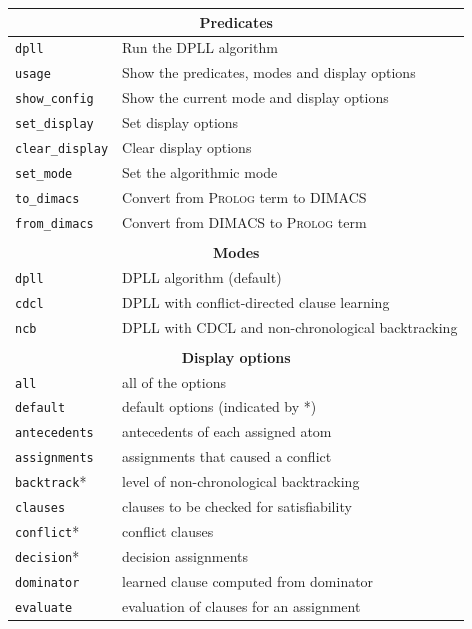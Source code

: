 \documentclass[11pt]{article}
\newcommand*{\p}[1]{\textup{\texttt{#1}}}
\newcommand*{\pl}{\textsc{Prolog}}
\begin{document}
\bigskip\bigskip

\begin{center}
\begin{tabular}{|l|l|}
\hline
\multicolumn{2}{|c|}{\textbf{\large Predicates}}\\
\hline
\p{dpll}&Run the DPLL algorithm\\
\p{usage}&Show the predicates, modes and display options \\
\p{show\_config}&Show the current mode and display options\\
\p{set\_display}&Set display options\\
\p{clear\_display}&Clear display options\\
\p{set\_mode}&Set the algorithmic mode\\
\p{to\_dimacs}&Convert from \pl{} term to DIMACS\\
\p{from\_dimacs}&Convert from DIMACS to \pl{} term\\
\hline
\multicolumn{2}{c}{}\\
\hline
\multicolumn{2}{|c|}{\textbf{\large Modes}}\\
\hline
\p{dpll} & DPLL algorithm (default)\\
\p{cdcl} & DPLL with conflict-directed clause learning\\
\p{ncb} &  DPLL with CDCL and non-chronological backtracking\\
\hline
\multicolumn{2}{c}{}\\
\hline
\multicolumn{2}{|c|}{\textbf{\large Display options}}\\
\hline
\p{all}       &  all of the options\\
\p{default}   &  default options (indicated by *)\\
\hline
\p{antecedents}&  antecedents of each assigned atom\\
\p{assignments}& assignments that caused a conflict         \\
\p{backtrack}*&  level of non-chronological backtracking    \\
\p{clauses}   &  clauses to be checked for satisfiability   \\
\p{conflict}* &  conflict clauses                           \\
\p{decision}* &  decision assignments                       \\
\p{dominator} &  learned clause computed from dominator     \\
\p{evaluate}  &  evaluation of clauses for an assignment    \\

\end{tabular}
\end{center}
\end{document}
